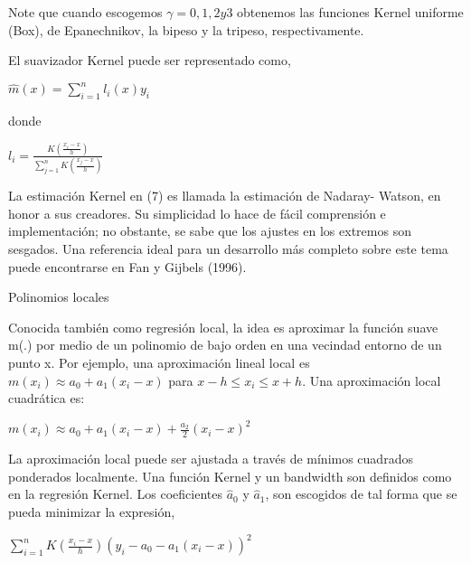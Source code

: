 \hspace*{0.4 cm} Note que cuando escogemos $\gamma = 0, 1, 2 y 3$ obtenemos las funciones Kernel uniforme (Box), de Epanechnikov, la bipeso y la tripeso, respectivamente.

\hspace*{0.4 cm} El suavizador Kernel puede ser representado como,

\begin{center}
$\displaystyle{\hat{m}(x) = \sum_{i=1}^{n} l_{i}(x) y_{i} }$
\end{center}

\noindent donde

\begin{center}
$\displaystyle{l_{i} = \frac{K(\frac{x_{i}-x}{h})}{\sum_{j=1}^{n} K(\frac{x_{j}-x}{h})} }$
\end{center}


\hspace*{0.4 cm} La estimaci\'on Kernel en (7) es llamada la estimaci\'on de Nadaray- Watson, en honor a sus creadores. Su simplicidad lo hace de f\'acil comprensi\'on e implementaci\'on; no obstante, se sabe que los ajustes en los extremos son sesgados. Una referencia ideal para un desarrollo m\'as completo sobre este tema puede encontrarse en Fan y Gijbels (1996).


Polinomios locales


\hspace*{0.4 cm} Conocida tambi\'en como regresi\'on local, la idea es aproximar la funci\'on suave m(.) por medio de un polinomio de bajo orden en una vecindad entorno de un punto x. Por ejemplo, una aproximaci\'on lineal local es $m(x_{i}) \approx a_{0} + a_{1}(x_{i}-x)$ para $x - h \leq x_{i} \leq x+h$. Una aproximaci\'on local cuadr\'atica es:

\begin{center}
$\displaystyle{m(x_{i}) \approx  a_{0} + a_{1}(x_{i}-x) + \frac{a_{2}}{2}(x_{i}-x)^2}$
\end{center}

\hspace*{0.4 cm} La aproximaci\'on local puede ser ajustada a trav\'es de m\'inimos cuadrados ponderados localmente. Una funci\'on Kernel y un bandwidth son definidos como en la regresi\'on Kernel. Los coeficientes $\hat{a}_{0}$ y $\hat{a}_{1}$, son escogidos de tal forma que se pueda minimizar la expresi\'on,

\begin{center}
$\displaystyle{ \sum_{i=1}^{n} K(\frac{x_{i}-x}{h}) (y_{i}-a_{0}-a_{1}(x_{i}-x))^2 }$
\end{center}

